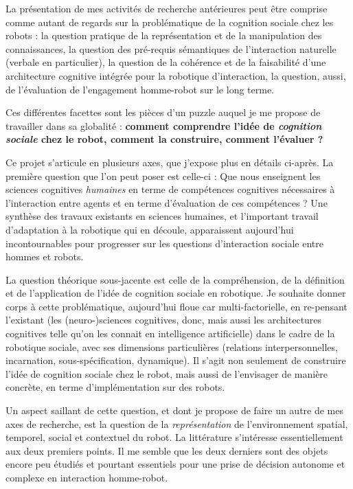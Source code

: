 \documentclass[a4paper]{article}
\begin{document}
La présentation de mes activités de recherche antérieures peut être comprise comme
autant de regards sur la problématique de la cognition sociale chez les robots : la
question pratique de la représentation et de la manipulation des connaissances,
la question des pré-requis sémantiques de l'interaction naturelle (verbale en
particulier), la question de la cohérence et de la faisabilité d'une
architecture cognitive intégrée pour la robotique d'interaction, la question,
aussi, de l'évaluation de l'engagement homme-robot sur le long terme.

Ces différentes facettes sont les pièces d'un puzzle auquel je me propose de
travailler dans sa globalité : \textbf{comment comprendre l'idée de \emph{cognition
sociale} chez le robot, comment la construire, comment l'évaluer ?}

Ce projet s'articule en plusieurs axes, que j'expose plus en détails ci-après.
La première question que l'on peut poser est celle-ci : Que nous enseignent les
sciences cognitives \emph{humaines} en terme de compétences cognitives
nécessaires à l'interaction entre agents et en terme d'évaluation de ces
compétences ? Une synthèse des travaux existants en sciences humaines, et
l'important travail d'adaptation à la robotique qui en découle, apparaissent
aujourd'hui incontournables pour progresser sur les questions d'interaction
sociale entre hommes et robots.

La question théorique sous-jacente est celle de la compréhension, de la
définition et de l'application de l'idée de cognition sociale en robotique. Je
souhaite donner corps à cette problématique, aujourd'hui floue car
multi-factorielle, en re-pensant l'existant (les (neuro-)sciences cognitives, donc,
mais aussi les architectures cognitives telle qu'on les connait en intelligence
artificielle) dans le cadre de la robotique sociale, avec ses dimensions
particulières (relations interpersonnelles, incarnation, sous-spécification,
dynamique). Il s'agit non seulement de construire l'idée de cognition sociale
chez le robot, mais aussi de l'envisager de manière concrète, en terme
d'implémentation sur des robots.

Un aspect saillant de cette question, et dont je propose de faire un autre de
mes axes de recherche, est la question de la \emph{représentation} de
l'environnement spatial, temporel, social et contextuel du robot. La littérature
s'intéresse essentiellement aux deux premiers points. Il me semble que les deux
derniers sont des objets encore peu étudiés et pourtant essentiels pour une
prise de décision autonome et complexe en interaction homme-robot.
\end{document}
